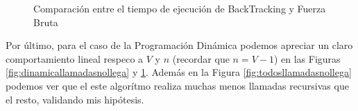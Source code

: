 \begin{figure}[H]
\begin{minipage}{0.45\textwidth}
        \caption{Comparaci\'on entre el tiempo de ejecuci\'on de BackTracking y Fuerza Bruta}
        \label{fig:dinamicatiemponollega} 
    \end{minipage}
\end{figure}

\par Por \'ultimo, para el caso de la Programaci\'on Din\'amica podemos apreciar un claro comportamiento lineal
respeco a $V$ y $n$ (recordar que $n = V-1$) en las Figuras \ref{fig:dinamicallamadasnollega} y 
\ref{fig:dinamicatiemponollega}. Adem\'as en la Figura \ref{fig:todosllamadasnollega} podemos ver que
el este algor\'itmo realiza muchas menos llamadas recursivas que el resto, validando mis hip\'otesis.
